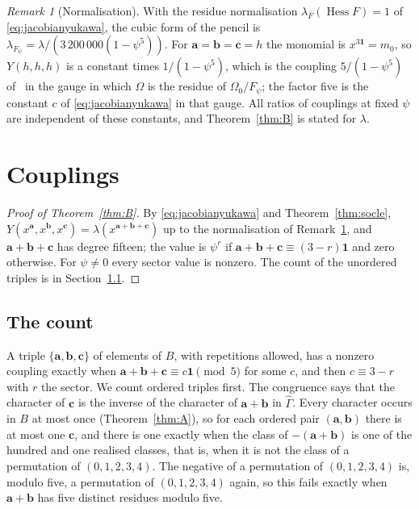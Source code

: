 \documentclass[11pt]{amsart}
\theoremstyle{definition}
\theoremstyle{remark}
\newtheorem{remark}[theorem]{Remark}
\newcommand{\Hess}{\operatorname{Hess}}
\newcommand{\bb}{\mathbf{b}}
\newcommand{\cc}{\mathbf{c}}
\newcommand{\va}{\mathbf{a}}
\newcommand{\one}{\mathbf{1}}
\begin{document}
\begin{remark}[Normalisation]\label{rem:hessian}
With the residue normalisation $\lambda_{F}(\Hess F)=1$ of
\eqref{eq:jacobianyukawa}, the cubic form of the pencil is
$\lambda_{F_\psi}=\lambda/(3\,200\,000(1-\psi^5))$. For $\va=\bb=\cc=h$ the
monomial is $x^{3\one}=m_0$, so $Y(h,h,h)$ is a constant times
$1/(1-\psi^5)$, which is the coupling $5/(1-\psi^5)$ of~\cite{CDGP91} in
the gauge in which $\Omega$ is the residue of $\Omega_0/F_\psi$; the
factor five is the constant $c$ of \eqref{eq:jacobianyukawa} in that gauge.
All ratios of couplings at fixed $\psi$ are independent of these
constants, and Theorem~\ref{thm:B} is stated for $\lambda$.
\end{remark}

\section{Couplings}\label{sec:couplings}

\begin{proof}[Proof of Theorem~\ref{thm:B}]
By \eqref{eq:jacobianyukawa} and Theorem~\ref{thm:socle},
$Y(x^{\va},x^{\bb},x^{\cc})=\lambda(x^{\va+\bb+\cc})$ up to the
normalisation of Remark~\ref{rem:hessian}, and $\va+\bb+\cc$ has degree
fifteen; the value is $\psi^r$ if $\va+\bb+\cc\equiv(3-r)\one$ and zero
otherwise. For $\psi\ne0$ every sector value is nonzero. The count of the
unordered triples is in Section~\ref{sec:count}.
\end{proof}

\subsection{The count}\label{sec:count}

A triple $\{\va,\bb,\cc\}$ of elements of $B$, with repetitions allowed, has
a nonzero coupling exactly when $\va+\bb+\cc\equiv c\one\pmod5$ for some
$c$, and then $c\equiv3-r$ with $r$ the sector. We count ordered triples
first. The congruence says that the character of $\cc$ is the inverse of the
character of $\va+\bb$ in $\widehat\Gamma$. Every character occurs in $B$ at
most once (Theorem~\ref{thm:A}), so for each ordered pair $(\va,\bb)$ there
is at most one $\cc$, and there is one exactly when the class of
$-(\va+\bb)$ is one of the hundred and one realised classes, that is, when it
is not the class of a permutation of $(0,1,2,3,4)$. The negative of a
permutation of $(0,1,2,3,4)$ is, modulo five, a permutation of
$(0,1,2,3,4)$ again, so this fails exactly when $\va+\bb$ has five distinct
residues modulo five.
\end{document}
